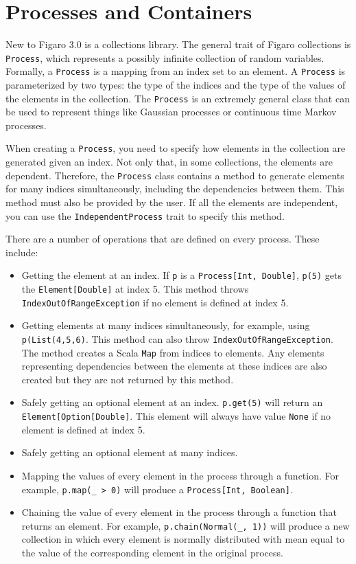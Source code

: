 \section{Processes and Containers}

New to Figaro 3.0 is a collections library. The general trait of Figaro collections is \texttt{Process}, which represents a possibly infinite collection of random variables. Formally, a \texttt{Process} is a mapping from an index set to an element. A \texttt{Process} is parameterized by two types: the type of the indices and the type of the values of the elements in the collection. The \texttt{Process} is an extremely general class that can be used to represent things like Gaussian processes or continuous time Markov processes.

When creating a \texttt{Process}, you need to specify how elements in the collection are generated given an index. Not only that, in some collections, the elements are dependent. Therefore, the \texttt{Process} class contains a method to generate elements for many indices simultaneously, including the dependencies between them. This method must also be provided by the user. If all the elements are independent, you can use the \texttt{IndependentProcess} trait to specify this method.

There are a number of operations that are defined on every process. These include:
\begin{itemize}
\item Getting the element at an index. If \texttt{p} is a \texttt{Process[Int, Double]}, \texttt{p(5)} gets the \texttt{Element[Double]} at index 5. This method throws \texttt{IndexOutOfRangeException} if no element is defined at index 5.
\item Getting elements at many indices simultaneously, for example, using \texttt{p(List(4,5,6)}. This method can also throw \texttt{IndexOutOfRangeException}. The method creates a Scala \texttt{Map} from indices to elements. Any elements representing dependencies between the elements at these indices are also created but they are not returned by this method.
\item Safely getting an optional element at an index. \texttt{p.get(5)} will return an \texttt{Element[Option[Double]}. This element will always have value \texttt{None} if no element is defined at index 5.
\item Safely getting an optional element at many indices.
\item Mapping the values of every element in the process through a function. For example, \texttt{p.map(_ > 0)} will produce a \texttt{Process[Int, Boolean]}.
\item Chaining the value of every element in the process through a function that returns an element. For example, \texttt{p.chain(Normal(_, 1))} will produce a new collection in which every element is normally distributed with mean equal to the value of the corresponding element in the original process.
\end{itemize}

